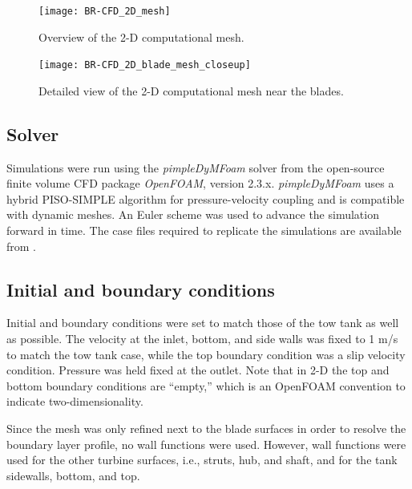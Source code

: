 \documentclass[aip,graphicx]{revtex4-1}
\begin{document}
\begin{figure}
    \centering
    
    \texttt{[image: BR-CFD\_2D\_mesh]}
    
    \caption{Overview of the 2-D computational mesh.}
    
    \label{fig:2d-br-mesh}
\end{figure}


\begin{figure}
    \centering
    
    \texttt{[image: BR-CFD\_2D\_blade\_mesh\_closeup]}
    
    \caption{Detailed view of the 2-D computational mesh near the blades.}
    
    \label{fig:blade-mesh}
\end{figure}


\subsection{Solver}

Simulations were run using the \textit{pimpleDyMFoam} solver from the
open-source finite volume CFD package \textit{OpenFOAM}, version 2.3.x.
\textit{pimpleDyMFoam} uses a hybrid PISO-SIMPLE algorithm for pressure-velocity
coupling and is compatible with dynamic meshes. An Euler scheme was used to
advance the simulation forward in time. The case files required to replicate the
simulations are available from \cite{Bachant2016-UNH-RVAT-2D-OpenFOAM-SST,
    Bachant2016-UNH-RVAT-2D-OpenFOAM-SA, Bachant2016-UNH-RVAT-3D-OpenFOAM-SST,
    Bachant2016-UNH-RVAT-3D-OpenFOAM-SA}.


\subsection{Initial and boundary conditions}

Initial and boundary conditions were set to match those of the tow tank as well
as possible. The velocity at the inlet, bottom, and side walls was fixed to 1
m/s to match the tow tank case, while the top boundary condition was a slip
velocity condition. Pressure was held fixed at the outlet. Note that in 2-D the
top and bottom boundary conditions are ``empty,'' which is an OpenFOAM
convention to indicate two-dimensionality.

Since the mesh was only refined next to the blade surfaces in order to resolve
the boundary layer profile, no wall functions were used. However, wall functions
were used for the other turbine surfaces, i.e., struts, hub, and shaft, and for
the tank sidewalls, bottom, and top.
\end{document}
